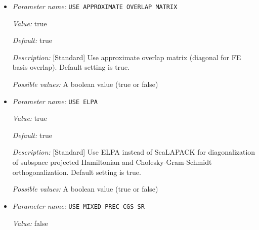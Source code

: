 \begin{itemize}
{\it Value:} FP32


{\it Default:} FP32


{\it Description:} [Advanced] Tensor operation datatype for the modified single precision algorithm for Chebyshev filtering, this only used on Nvidia GPUs with compute capability greater than 80. Default setting is FP32.


{\it Possible values:} Any one of FP32, TF32
\item {\it Parameter name:} {\tt USE APPROXIMATE OVERLAP MATRIX}
\label{parameters:SCF parameters/Eigen_2dsolver parameters/USE APPROXIMATE OVERLAP MATRIX}
\label{parameters:SCF_20parameters/Eigen_2dsolver_20parameters/USE_20APPROXIMATE_20OVERLAP_20MATRIX}


{\it Value:} true


{\it Default:} true


{\it Description:} [Standard] Use approximate overlap matrix (diagonal for FE basis overlap).  Default setting is true.


{\it Possible values:} A boolean value (true or false)
\item {\it Parameter name:} {\tt USE ELPA}
\label{parameters:SCF parameters/Eigen_2dsolver parameters/USE ELPA}
\label{parameters:SCF_20parameters/Eigen_2dsolver_20parameters/USE_20ELPA}


{\it Value:} true


{\it Default:} true


{\it Description:} [Standard] Use ELPA instead of ScaLAPACK for diagonalization of subspace projected Hamiltonian and Cholesky-Gram-Schmidt orthogonalization.  Default setting is true.


{\it Possible values:} A boolean value (true or false)
\item {\it Parameter name:} {\tt USE MIXED PREC CGS SR}
\label{parameters:SCF parameters/Eigen_2dsolver parameters/USE MIXED PREC CGS SR}
\label{parameters:SCF_20parameters/Eigen_2dsolver_20parameters/USE_20MIXED_20PREC_20CGS_20SR}


{\it Value:} false



\end{itemize}
